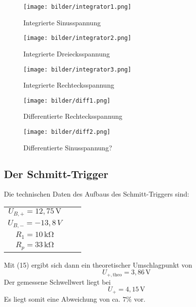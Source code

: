 \begin{figure}[H]
  \centering
  \texttt{[image: bilder/integrator1.png]}
  \caption{Integrierte Sinusspannung}
\end{figure}
\begin{figure}[H]
  \centering
  \texttt{[image: bilder/integrator2.png]}
  \caption{Integrierte Dreiecksspannung}
\end{figure}
\begin{figure}[H]
  \centering
  \texttt{[image: bilder/integrator3.png]}
  \caption{Integrierte Rechtecksspannung}
\end{figure}
\begin{figure}[H]
  \centering
  \texttt{[image: bilder/diff1.png]}
  \caption{Differentierte Rechtecksspannung}
\end{figure}
\begin{figure}[H]
  \centering
  \texttt{[image: bilder/diff2.png]}
  \caption{Differentierte Sinusspannung?}%
\end{figure}
\subsection{Der Schmitt-Trigger}
Die technischen Daten des Aufbaus des Schmitt-Triggers sind:
\begin{table}[H]
\centering
\begin{tabular}{ccc}
$U_{B,+}=12{,}75 \,\si{\V}$ \\
$U_{B,-}=-13{,}8\,\si{V}$ \\
$R_1=10\,\si{\kilo\ohm}$ \\
$R_p=33\,\si{\kilo\ohm}$ \\
\end{tabular}
\end{table}
Mit (15) ergibt sich dann ein theoretischer Umschlagpunkt von
\begin{equation}
U_{+,\text{theo}}=3{,}86\,\si{\V}
\end{equation}
Der gemessene Schwellwert liegt bei
\begin{equation}
U_{+}=4{,}15\,\si{\V}
\end{equation}
Es liegt somit eine Abweichung von ca. $7\%$ vor.
